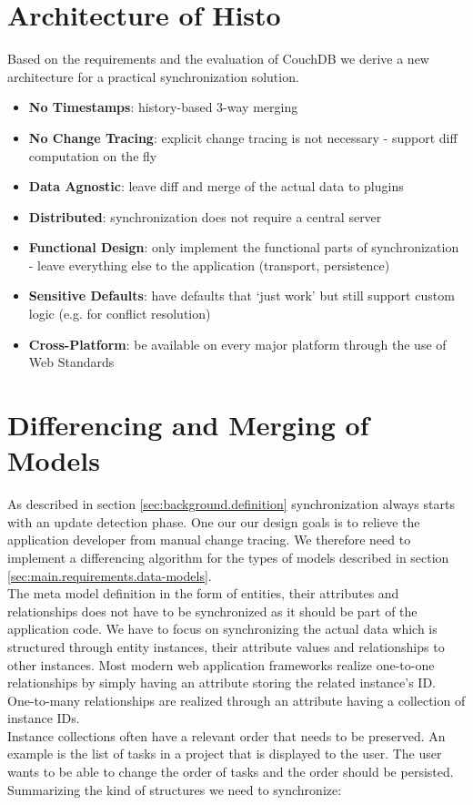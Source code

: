 
\section{Architecture of Histo}
\label{sec:main.histo}

Based on the requirements and the evaluation of CouchDB we derive a new architecture for a practical synchronization solution.

\begin{itemize}
\item
  \textbf{No Timestamps}: history-based 3-way merging
\item
  \textbf{No Change Tracing}: explicit change tracing is not necessary - support
  diff computation on the fly
\item
  \textbf{Data Agnostic}: leave diff and merge of the actual data to
  plugins
\item
  \textbf{Distributed}: synchronization does not require a central server
\item
  \textbf{Functional Design}: only implement the functional parts of synchronization - leave everything else to the application (transport, persistence)
\item
  \textbf{Sensitive Defaults}: have defaults that `just work' but
  still support custom logic (e.g. for conflict resolution)
\item
  \textbf{Cross-Platform}: be available on every major platform through the use of Web Standards
\end{itemize}

\section{Differencing and Merging of Models}
As described in section \ref{sec:background.definition} synchronization always starts with an update detection phase.
One our our design goals is to relieve the application developer from manual change tracing.
We therefore need to implement a differencing algorithm for the types of models described in section \ref{sec:main.requirements.data-models}.\\
The meta model definition in the form of entities, their attributes and relationships does not have to be synchronized as it should be part of the application code.
We have to focus on synchronizing the actual data which is structured through entity instances, their attribute values and relationships to other instances.
Most modern web application frameworks realize one-to-one relationships by simply having an attribute storing the related instance's ID.
One-to-many relationships are realized through an attribute having a collection of 
instance IDs.\\
Instance collections often have a relevant order that needs to be preserved.
An example is the list of tasks in a project that is displayed to the user.
The user wants to be able to change the order of tasks and the order should be persisted.\\
Summarizing the kind of structures we need to synchronize:

